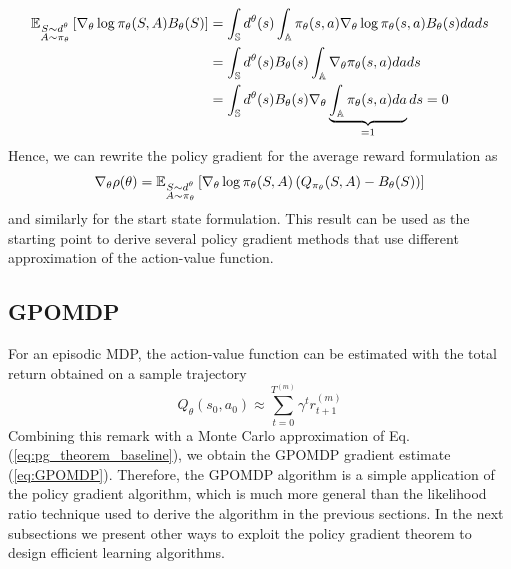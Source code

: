 \begin{equation*}
	\begin{split}
	\E[\substack{S \sim d^\theta\\A \sim \pi_\theta}]{\nabla_\theta\log
			\pi_\theta(S,A) B_\theta(S)} 
	&= \int_\S d^\theta(s) \int_\A \pi_\theta(s,a) \nabla_\theta\log
				\pi_\theta(s,a) B_\theta(s) da ds\\
	&= \int_\S d^\theta(s)  B_\theta(s) \int_\A \nabla_\theta \pi_\theta(s,a) da ds\\
	&= \int_\S d^\theta(s)  B_\theta(s)  \nabla_\theta  \underbrace{\int_\A  \pi_\theta(s,a) da}_{= 1} ds = 0
	\end{split}
\end{equation*}
Hence, we can rewrite the policy gradient for the average reward formulation as
\begin{equation}
\label{eq:pg_theorem_baseline}
	\nabla_\theta \rho(\theta) =
	\E[\substack{S \sim d^\theta\\A \sim \pi_\theta}]{\nabla_\theta\log
	\pi_\theta(S,A) \left(Q_{\pi_\theta}(S, A) - B_\theta(S)\right)}
\end{equation}
and similarly for the start state formulation. This result can be used as the starting point to derive several policy gradient methods that use different approximation of the action-value function. 

\subsection{GPOMDP}
For an episodic \gls{MDP}, the action-value function can be estimated with the total return obtained on a sample trajectory
\begin{equation*}
	Q_\theta(s_0,a_0) \approx \sum_{t=0}^{T^{(m)}} \gamma^t r_{t+1}^{(m)}
\end{equation*}
Combining this remark with a Monte Carlo approximation of Eq. (\ref{eq:pg_theorem_baseline}), we obtain the \gls{GPOMDP} gradient estimate (\ref{eq:GPOMDP}). Therefore, the \gls{GPOMDP} algorithm is a simple application of the policy gradient algorithm, which is much more general than the likelihood ratio technique used to derive the algorithm in the previous sections. In the next subsections we present other ways to exploit the policy gradient theorem to design efficient learning algorithms.

